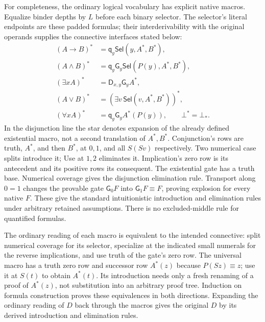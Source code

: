 \documentclass[11pt,letterpaper]{article}
\theoremstyle{definition}\newtheorem{definition}[theorem]{Definition}
\theoremstyle{remark}\newtheorem{remark}[theorem]{Remark}
\newcommand{\DD}{\mathsf D}
\newcommand{\qq}{\mathsf q}
\newcommand{\GG}{\mathsf G}
\newcommand{\Sel}{\mathsf{Sel}}
\newcommand{\bbot}{\bot_*}
\begin{document}
For completeness, the ordinary logical vocabulary has explicit native
macros. Equalize binder depths by $L$ before each binary selector.
The selector's literal endpoints are these padded formulas; their
interderivability with the original operands supplies the connective
interfaces stated below:
\begin{align*}
 (A\to B)^*&=\qq_y\Sel(y,A^*,B^*),\\
 (A\land B)^*&=\qq_y\GG_y\Sel(P(y),A^*,B^*),\\
 (\exists x A)^*&=\DD_{x,y}\GG_y A^*,\\
 (A\lor B)^*&=(\exists v\,\Sel(v,A^*,B^*))^*,\\
 (\forall x A)^*&=\qq_y\GG_y A^*(P(y)),\qquad
 \bot^*=\bbot.
\end{align*}
In the disjunction line the star denotes expansion of the already
defined existential macro, not a second translation of $A^*,B^*$.
Conjunction's rows are truth, $A^*$, and then $B^*$, at $0,1$, and
all $S(Sv)$ respectively. Two numerical case splits introduce it;
Use at $1,2$ eliminates it. Implication's zero row is its antecedent
and its positive rows its consequent. The existential gate has a truth
base. Numerical coverage gives the disjunction elimination rule.
Transport along $0=1$ changes the provable gate $\GG_0F$ into
$\GG_1F\equiv F$, proving explosion for every native $F$.
These give the standard intuitionistic introduction and elimination
rules under arbitrary retained assumptions. There is no excluded-middle
rule for quantified formulas.

The ordinary reading of each macro is equivalent to the intended
connective: split numerical coverage for its selector, specialize at
the indicated small numerals for the reverse implications, and use
truth of the gate's zero row. The universal macro has a truth zero row
and successor row $A^*(z)$ because $P(Sz)\equiv z$; use it at $S(t)$
to obtain $A^*(t)$. Its introduction needs only a fresh renaming of a
proof of $A^*(z)$, not substitution into an arbitrary proof tree.
Induction on formula construction proves
these equivalences in both directions. Expanding the ordinary reading
of $D$ back through the macros gives the original $D$ by its derived
introduction and elimination rules.
\end{document}
